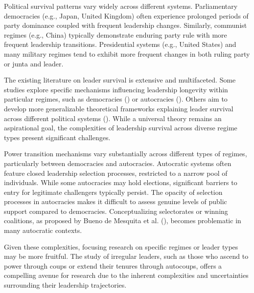 \documentclass[
  12pt,
]{report}
\begin{document}
Political survival patterns vary widely across different systems.
Parliamentary democracies (e.g., Japan, United Kingdom) often experience
prolonged periods of party dominance coupled with frequent leadership
changes. Similarly, communist regimes (e.g., China) typically
demonstrate enduring party rule with more frequent leadership
transitions. Presidential systems (e.g., United States) and many
military regimes tend to exhibit more frequent changes in both ruling
party or junta and leader.

The existing literature on leader survival is extensive and
multifaceted. Some studies explore specific mechanisms influencing
leadership longevity within particular regimes, such as democracies
() or autocracies
(). Others aim to develop more generalizable theoretical frameworks
explaining leader survival across different political systems
().
While a universal theory remains an aspirational goal, the complexities
of leadership survival across diverse regime types present significant
challenges.

Power transition mechanisms vary substantially across different types of
regimes, particularly between democracies and autocracies. Autocratic
systems often feature closed leadership selection processes, restricted
to a narrow pool of individuals. While some autocracies may hold
elections, significant barriers to entry for legitimate challengers
typically persist. The opacity of selection processes in autocracies
makes it difficult to assess genuine levels of public support compared
to democracies. Conceptualizing selectorates or winning coalitions, as
proposed by Bueno de Mesquita et al.
(), becomes problematic in many
autocratic contexts.

Given these complexities, focusing research on specific regimes or
leader types may be more fruitful. The study of irregular leaders, such
as those who ascend to power through coups or extend their tenures
through autocoups, offers a compelling avenue for research due to the
inherent complexities and uncertainties surrounding their leadership
trajectories.
\end{document}
